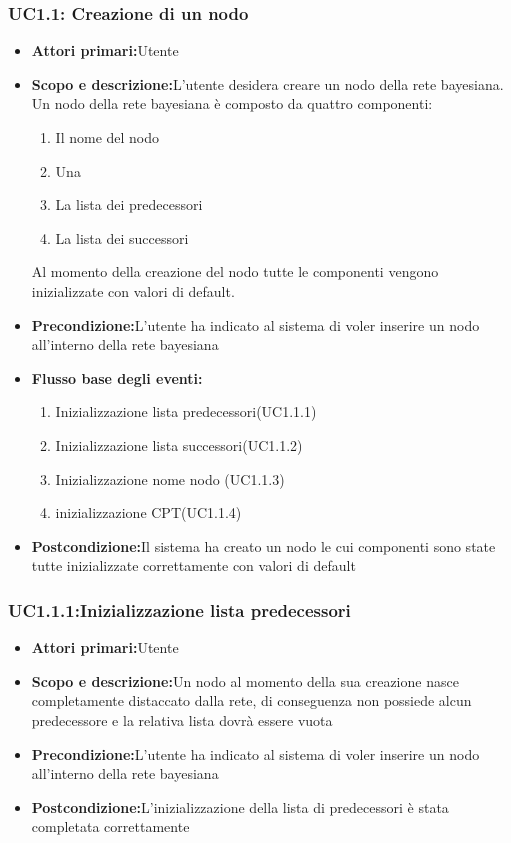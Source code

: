 \subsubsection{UC1.1: Creazione di un nodo}
\begin{itemize}
	\item{\textbf{Attori primari:}Utente}
	\item{\textbf{Scopo e descrizione:}L'utente desidera creare un nodo della rete bayesiana. Un nodo della rete bayesiana è composto da quattro componenti:
	\begin{enumerate}
		\item{Il nome del nodo}
		\item{Una }
		\item{La lista dei predecessori}
		\item{La lista dei successori}
	\end{enumerate}
Al momento della creazione del nodo tutte le componenti vengono inizializzate con valori di default.}
	\item{\textbf{Precondizione:}L'utente ha indicato al sistema di voler inserire un nodo all'interno della rete bayesiana}
	\item{\textbf{Flusso base degli eventi:}}
		\begin{enumerate}
			\item{Inizializzazione lista predecessori(UC1.1.1)}
			\item{Inizializzazione lista successori(UC1.1.2)}
			\item{Inizializzazione nome nodo (UC1.1.3)}
			\item{inizializzazione CPT(UC1.1.4)}
		\end{enumerate}
	\item{\textbf{Postcondizione:}Il sistema ha creato un nodo le cui componenti sono state tutte inizializzate correttamente con valori di default}
\end{itemize}
\subsubsection{UC1.1.1:Inizializzazione lista predecessori}
\begin{itemize}
	\item{\textbf{Attori primari:}Utente}
	\item{\textbf{Scopo e descrizione:}Un nodo al momento della sua creazione nasce completamente distaccato dalla rete, di conseguenza non possiede alcun predecessore e la relativa lista dovrà essere vuota}
	\item{\textbf{Precondizione:}L'utente ha indicato al sistema di voler inserire un nodo all'interno della rete bayesiana}
	\item{\textbf{Postcondizione:}L'inizializzazione della lista di predecessori è stata completata correttamente}
\end{itemize}
